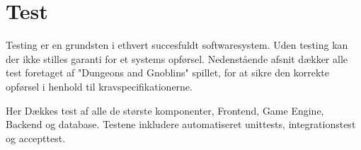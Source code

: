 \section{Test}
Testing er en grundsten i ethvert succesfuldt softwaresystem. Uden testing kan
der ikke stilles garanti for et systems opførsel. Nedenstående afsnit dækker
alle test foretaget af "Dungeons and Gnoblins" spillet, for at sikre den korrekte
opførsel i henhold til kravspecifikationerne.

Her Dækkes test af alle de største komponenter, Frontend, Game Engine, Backend og
database. Testene inkludere automatiseret unittests, integrationstest og accepttest.




